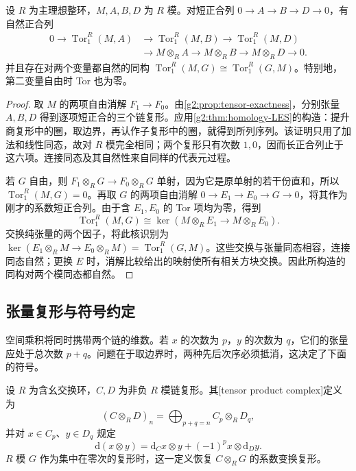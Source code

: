 \begin{proposition}\label{g2:prop:tor-symmetry}
	设 \(R\) 为主理想整环，\(M,A,B,D\) 为 \(R\) 模。对短正合列 \(0\to A\to B\to D\to0\)，有自然正合列
	\[
		\begin{aligned}
			0\longrightarrow\operatorname{Tor}^R_1(M,A)&\longrightarrow\operatorname{Tor}^R_1(M,B)\longrightarrow\operatorname{Tor}^R_1(M,D)\\
			&\longrightarrow M\otimes_R A\longrightarrow M\otimes_R B\longrightarrow M\otimes_R D\longrightarrow0.
		\end{aligned}
	\]
	并且存在对两个变量都自然的同构 \(\operatorname{Tor}^R_1(M,G)\cong\operatorname{Tor}^R_1(G,M)\)。特别地，第二变量自由时 Tor 也为零。
\end{proposition}
\begin{proof}
	取 \(M\) 的两项自由消解 \(F_1\to F_0\)。由\cref{g2:prop:tensor-exactness}，分别张量 \(A,B,D\) 得到逐项短正合的三个链复形。应用\cref{g2:thm:homology-LES}的构造：提升商复形中的圈，取边界，再认作子复形中的圈，就得到所列序列。该证明只用了加法和线性同态，故对 \(R\) 模完全相同；两个复形只有次数 \(1,0\)，因而长正合列止于这六项。连接同态及其自然性来自同样的代表元过程。

	若 \(G\) 自由，则 \(F_1\otimes_R G\to F_0\otimes_R G\) 单射，因为它是原单射的若干份直和，所以 \(\operatorname{Tor}^R_1(M,G)=0\)。再取 \(G\) 的两项自由消解 \(0\to E_1\to E_0\to G\to0\)，将其作为刚才的系数短正合列。由于含 \(E_1,E_0\) 的 Tor 项均为零，得到
	\[
		\operatorname{Tor}^R_1(M,G)\cong\ker(M\otimes_R E_1\longrightarrow M\otimes_R E_0).
	\]
	交换纯张量的两个因子，将此核识别为 \(\ker(E_1\otimes_R M\to E_0\otimes_R M)=\operatorname{Tor}^R_1(G,M)\)。这些交换与张量同态相容，连接同态自然；更换 \(E\) 时，消解比较给出的映射使所有相关方块交换。因此所构造的同构对两个模同态都自然。
\end{proof}

\subsection{张量复形与符号约定}
\label{g2:subsec:0401:04}
空间乘积将同时携带两个链的维数。若 \(x\) 的次数为 \(p\)，\(y\) 的次数为 \(q\)，它们的张量应处于总次数 \(p+q\)。问题在于取边界时，两种先后次序必须抵消，这决定了下面的符号。

\begin{definition}\label{g2:def:tensor-chain-complex}
	设 \(R\) 为含幺交换环，\(C,D\) 为非负 \(R\) 模链复形。其[tensor product complex]定义为
	\[
		(C\otimes_R D)_n=\bigoplus_{p+q=n}C_p\otimes_R D_q,
	\]
	并对 \(x\in C_p\)、\(y\in D_q\) 规定
	\begin{equation}\label{g2:eq:tensor-differential}
		\mathrm{d}(x\otimes y)=\mathrm{d}_Cx\otimes y+(-1)^p x\otimes\mathrm{d}_Dy.
	\end{equation}
	\(R\) 模 \(G\) 作为集中在零次的复形时，这一定义恢复 \(C\otimes_R G\) 的系数变换复形。
\end{definition}

